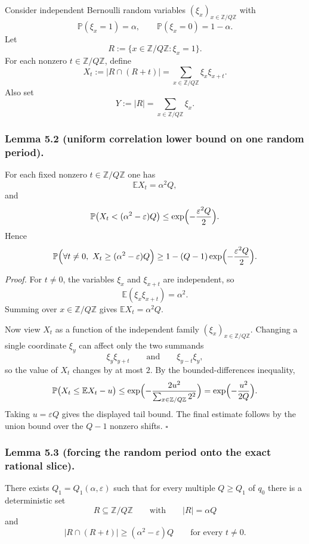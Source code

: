 Consider independent Bernoulli random variables $(\xi_x)_{x\in\mathbb Z/Q\mathbb Z}$ with
\[
\mathbb P(\xi_x=1)=\alpha,
\qquad \mathbb P(\xi_x=0)=1-\alpha.
\]
Let
\[
R:=\{x\in\mathbb Z/Q\mathbb Z: \xi_x=1\}.
\]
For each nonzero $t\in\mathbb Z/Q\mathbb Z$, define
\[
X_t:=|R\cap(R+t)| = \sum_{x\in\mathbb Z/Q\mathbb Z} \xi_x\xi_{x+t}.
\]
Also set
\[
Y:=|R|=\sum_{x\in\mathbb Z/Q\mathbb Z}\xi_x.
\]

\subsubsection*{Lemma 5.2 (uniform correlation lower bound on one random period).}
For each fixed nonzero $t\in\mathbb Z/Q\mathbb Z$ one has
\[
\mathbb E X_t = \alpha^2 Q,
\]
and
\[
\mathbb P\bigl(X_t< (\alpha^2-\varepsilon)Q\bigr)
\le \exp\Bigl(-\frac{\varepsilon^2Q}{2}\Bigr).
\]
Hence
\[
\mathbb P\Bigl(\forall t\neq 0,\ X_t\ge (\alpha^2-\varepsilon)Q\Bigr)
\ge 1-(Q-1)\exp\Bigl(-\frac{\varepsilon^2Q}{2}\Bigr).
\]

\emph{Proof.}
For $t\neq 0$, the variables $\xi_x$ and $\xi_{x+t}$ are independent, so
\[
\mathbb E(\xi_x\xi_{x+t})=\alpha^2.
\]
Summing over $x\in\mathbb Z/Q\mathbb Z$ gives $\mathbb E X_t=\alpha^2Q$.

Now view $X_t$ as a function of the independent family $(\xi_x)_{x\in\mathbb Z/Q\mathbb Z}$. Changing a single coordinate $\xi_y$ can affect only the two summands
\[
\xi_y\xi_{y+t}
\qquad\text{and}\qquad
\xi_{y-t}\xi_y,
\]
so the value of $X_t$ changes by at most $2$. By the bounded-differences inequality,
\[
\mathbb P\bigl(X_t\le \mathbb EX_t-u\bigr)
\le \exp\Bigl(-\frac{2u^2}{\sum_{x\in\mathbb Z/Q\mathbb Z} 2^2}\Bigr)
=\exp\Bigl(-\frac{u^2}{2Q}\Bigr).
\]
Taking $u=\varepsilon Q$ gives the displayed tail bound. The final estimate follows by the union bound over the $Q-1$ nonzero shifts. \hfill$\square$

\subsubsection*{Lemma 5.3 (forcing the random period onto the exact rational slice).}
There exists $Q_1=Q_1(\alpha,\varepsilon)$ such that for every multiple $Q\ge Q_1$ of $q_0$ there is a deterministic set
\[
R\subseteq \mathbb Z/Q\mathbb Z
\qquad\text{with}\qquad
|R|=\alpha Q
\]
and
\[
|R\cap(R+t)|\ge (\alpha^2-\varepsilon)Q
\qquad\text{for every }t\neq 0.
\]

